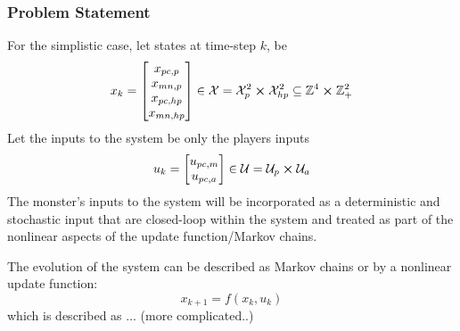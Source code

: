 \documentclass[9pt, onecolumn]{report}
\newcommand{\Z}{\mathbb{Z}}
\begin{document}
\subsubsection{Problem Statement}
For the simplistic case, let states at time-step $k$, be \[
    x_k = \mqty[x_{pc,p}\\x_{mn,p}\\x_{pc,hp}\\x_{mn,hp}] \in \mathcal{X} = \mathcal{X}_p^2 \cross \mathcal{X}_{hp}^2 \subseteq \Z^{4} \cross \Z_{+}^{2}
\] Let the inputs to the system be only the players inputs \[
    u_k = \mqty[u_{pc,m}\\u_{pc,a}] \in \mathcal{U} = \mathcal{U}_{p} \cross \mathcal{U}_{a} %
\] The monster's inputs to the system will be incorporated as a deterministic and stochastic input that are closed-loop within the system and treated as part of the nonlinear aspects of the update function/Markov chains.

The evolution of the system can be described as Markov chains or by a nonlinear update function:\[
    x_{k+1} = f(x_k, u_k)
\] which is described as ... (more complicated..)










% 
% 
\end{document}
